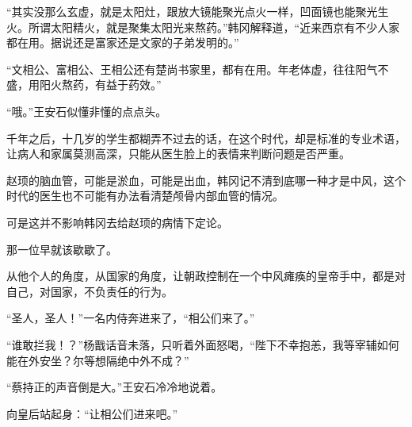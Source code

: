 “其实没那么玄虚，就是太阳灶，跟放大镜能聚光点火一样，凹面镜也能聚光生火。所谓太阳精火，就是聚集太阳光来熬药。”韩冈解释道，“近来西京有不少人家都在用。据说还是富家还是文家的子弟发明的。”

“文相公、富相公、王相公还有楚尚书家里，都有在用。年老体虚，往往阳气不盛，用阳火熬药，有益于药效。”

“哦。”王安石似懂非懂的点点头。

千年之后，十几岁的学生都糊弄不过去的话，在这个时代，却是标准的专业术语，让病人和家属莫测高深，只能从医生脸上的表情来判断问题是否严重。

赵顼的脑血管，可能是淤血，可能是出血，韩冈记不清到底哪一种才是中风，这个时代的医生也不可能有办法看清楚颅骨内部血管的情况。

可是这并不影响韩冈去给赵顼的病情下定论。

那一位早就该歇歇了。

从他个人的角度，从国家的角度，让朝政控制在一个中风瘫痪的皇帝手中，都是对自己，对国家，不负责任的行为。

“圣人，圣人！”一名内侍奔进来了，“相公们来了。”

“谁敢拦我！？”杨戬话音未落，只听着外面怒喝，“陛下不幸抱恙，我等宰辅如何能在外安坐？尔等想隔绝中外不成？”

“蔡持正的声音倒是大。”王安石冷冷地说着。

向皇后站起身：“让相公们进来吧。”

